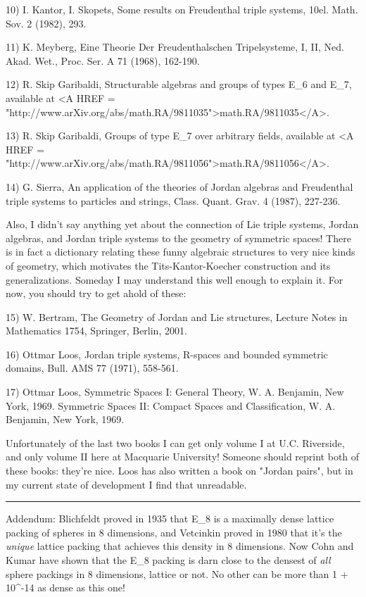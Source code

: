 10) I. Kantor, I. Skopets, Some results on Freudenthal triple systems,
10el. Math. Sov. 2 (1982), 293.

11) K. Meyberg, Eine Theorie Der Freudenthalschen Tripelsysteme, I, II,
Ned. Akad. Wet., Proc. Ser. A 71 (1968), 162-190.

12) R. Skip Garibaldi, Structurable algebras and groups of types E_{6} and 
E_{7}, available at <A HREF = "http://www.arXiv.org/abs/math.RA/9811035">math.RA/9811035</A>.

13) R. Skip Garibaldi, Groups of type E_{7} over arbitrary fields,
available at
<A HREF = "http://www.arXiv.org/abs/math.RA/9811056">math.RA/9811056</A>.

14) G. Sierra, An application of the theories of Jordan algebras and 
Freudenthal triple systems to particles and strings, Class. Quant. Grav. 
4 (1987), 227-236.  

Also, I didn't say anything yet about the connection of Lie triple
systems, Jordan algebras, and Jordan triple systems to the geometry 
of symmetric spaces!  There is in fact a dictionary relating these 
funny algebraic structures to very nice kinds of geometry, which
motivates the Tits-Kantor-Koecher construction and its generalizations.
Someday I may understand this well enough to explain it.  For now, 
you should try to get ahold of these:

15) W. Bertram, The Geometry of Jordan and Lie structures, 
Lecture Notes in Mathematics 1754, Springer, Berlin, 2001.

16) Ottmar Loos, Jordan triple systems, R-spaces and bounded symmetric 
domains, Bull. AMS 77 (1971), 558-561. 

17) Ottmar Loos, Symmetric Spaces I: General Theory, W. A. Benjamin, 
New York, 1969.  Symmetric Spaces II: Compact Spaces and Classification,
W. A. Benjamin, New York, 1969.

Unfortunately of the last two books I can get only volume I at U.C. 
Riverside, and only volume II here at Macquarie University!  Someone 
should reprint both of these books: they're nice.  Loos has also
written a book on "Jordan pairs", but in my current state of
development I find that unreadable.

\par\noindent\rule{\textwidth}{0.4pt}
Addendum: Blichfeldt proved in 1935 that E_{8} is a maximally dense
lattice packing of spheres in 8 dimensions, and Vetcinkin proved
in 1980 that it's the \emph{unique} lattice packing that 
achieves this density in 8 dimensions.
Now Cohn and Kumar have shown that the E_{8} packing is darn close to the 
densest of \emph{all} sphere packings in 8 dimensions, lattice or not.
No other can be more than 1 + 10^{-14} as dense as this one!

